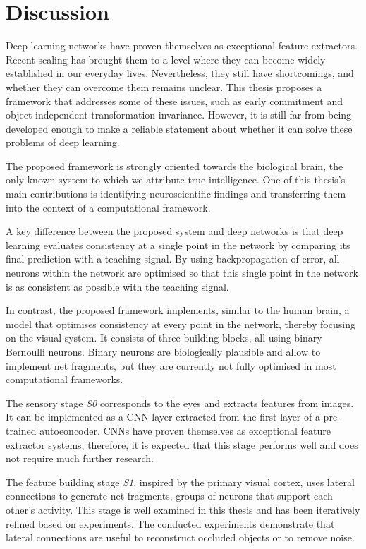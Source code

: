 \section{Discussion}
Deep learning networks have proven themselves as exceptional feature extractors.
Recent scaling has brought them to a level where they can become widely established in our everyday lives.
Nevertheless, they still have shortcomings, and whether they can overcome them remains unclear.
This thesis proposes a framework that addresses some of these issues, such as early commitment and object-independent transformation invariance.
However, it is still far from being developed enough to make a reliable statement about whether it can solve these problems of deep learning.

The proposed framework is strongly oriented towards the biological brain, the only known system to which we attribute true intelligence.
One of this thesis's main contributions is identifying neuroscientific findings and transferring them into the context of a computational framework.

A key difference between the proposed system and deep networks is that deep learning evaluates consistency at a single point in the network by comparing its final prediction with a teaching signal.
By using backpropagation of error, all neurons within the network are optimised so that this single point in the network is as consistent as possible with the teaching signal.

In contrast, the proposed framework implements, similar to the human brain, a model that optimises consistency at every point in the network, thereby focusing on the visual system.
It consists of three building blocks, all using binary Bernoulli neurons.
Binary neurons are biologically plausible and allow to implement net fragments, but they are currently not fully optimised in most computational frameworks.

The sensory stage \emph{S0} corresponds to the eyes and extracts features from images.
It can be implemented as a CNN layer extracted from the first layer of a pre-trained autoeoncoder. CNNs have proven themselves as exceptional feature extractor systems, therefore, it is expected that this stage performs well and does not require much further research.

The feature building stage \emph{S1}, inspired by the primary visual cortex, uses lateral connections to generate net fragments, groups of neurons that support each other's activity. 
This stage is well examined in this thesis and has been iteratively refined based on experiments.
The conducted experiments demonstrate that lateral connections are useful to reconstruct occluded objects or to remove noise.

